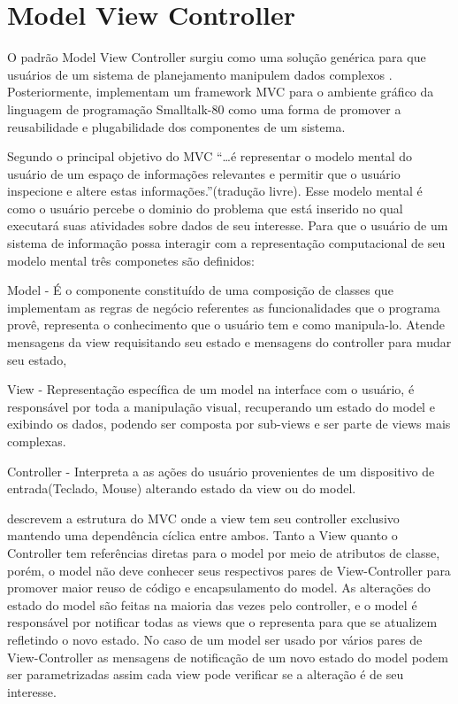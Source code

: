 \section{Model View Controller}

O padrão Model View Controller surgiu como uma solução genérica para que
usuários de um sistema de planejamento manipulem dados complexos
. Posteriormente, 
implementam um framework MVC para o ambiente gráfico da linguagem de programação
Smalltalk-80 como uma forma de promover a reusabilidade e plugabilidade dos
componentes de um sistema.

Segundo  o principal objetivo do MVC
``\ldots é representar o modelo mental do usuário de um espaço de informações
relevantes e permitir que o usuário inspecione e altere estas
informações.''(tradução livre).
Esse modelo mental é como o usuário percebe o dominio do problema que está inserido no qual executará suas atividades sobre dados de seu interesse. Para que o usuário de um sistema de
informação possa interagir com a representação computacional  de seu modelo
mental três componetes são definidos:

Model - É o componente constituído de uma composição de classes que implementam
as regras de negócio referentes as funcionalidades que o programa provê,
representa o  conhecimento que o usuário tem e como manipula-lo. Atende
mensagens da view requisitando seu estado e mensagens do controller para mudar
seu estado,

View - Representação específica de um model na interface com o usuário, é 
responsável por toda a manipulação visual, recuperando um estado do model e
exibindo os dados, podendo ser composta por sub-views e ser parte de views mais
complexas.

Controller - Interpreta a as ações do usuário provenientes de um dispositivo de
entrada(Teclado, Mouse) alterando estado da view ou do model.




 descrevem a estrutura do MVC onde a view tem seu
controller exclusivo mantendo uma dependência cíclica entre ambos. Tanto a View
quanto o Controller tem referências diretas para o model por meio de atributos
de classe, porém, o model não deve conhecer seus respectivos pares de
View-Controller para promover maior reuso de código e encapsulamento do model.
As alterações do estado do model são feitas na maioria das vezes pelo controller, e
o model é responsável por notificar todas as views que o representa para que
se atualizem refletindo o novo estado. No caso de um model ser usado por vários
pares de View-Controller as mensagens de notificação de um novo estado do model
podem ser parametrizadas assim cada view pode verificar se a alteração é de seu
interesse. 

